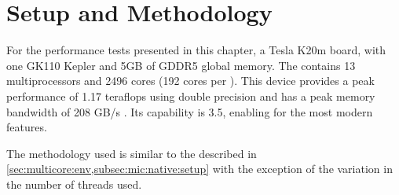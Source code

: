 \documentclass[../thesis]{subfiles}
\begin{document}
	\section{Setup and Methodology}
	\label{sec:cuda:setup}

	For the performance tests presented in this chapter, a \nvidia Tesla K20m board, with one GK110 Kepler \gpu \cite{NVIDIA:KEPLER} and 5GB of GDDR5 global memory. The \gpu contains 13 multiprocessors and 2496 \cuda cores (192 cores per \smx). This device provides a peak performance of 1.17 teraflops using double precision and has a peak memory bandwidth of 208 GB/s \cite{NVIDIA:TeslaKSeriesOverview}. Its \cuda capability is 3.5, enabling for the most modern \nvidia\gpu features.

	The methodology used is similar to the described in \cref{sec:multicore:env,subsec:mic:native:setup} with the exception of the variation in the number of threads used.
\end{document}
